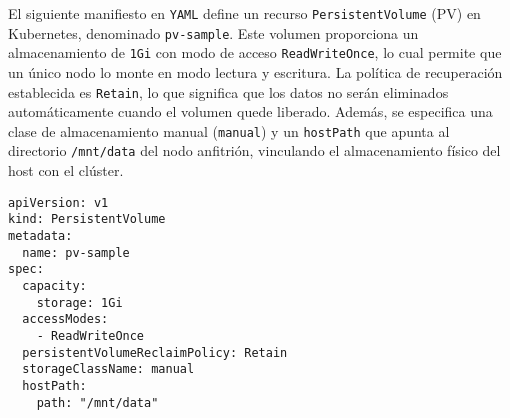 El siguiente manifiesto en \texttt{YAML} define un recurso \texttt{PersistentVolume} (PV) en Kubernetes, denominado \texttt{pv-sample}. Este volumen proporciona un almacenamiento de \texttt{1Gi} con modo de acceso \texttt{ReadWriteOnce}, lo cual permite que un único nodo lo monte en modo lectura y escritura. La política de recuperación establecida es \texttt{Retain}, lo que significa que los datos no serán eliminados automáticamente cuando el volumen quede liberado. Además, se especifica una clase de almacenamiento manual (\texttt{manual}) y un \texttt{hostPath} que apunta al directorio \texttt{/mnt/data} del nodo anfitrión, vinculando el almacenamiento físico del host con el clúster.

\begin{verbatim}
apiVersion: v1
kind: PersistentVolume
metadata:
  name: pv-sample
spec:
  capacity:
    storage: 1Gi
  accessModes:
    - ReadWriteOnce
  persistentVolumeReclaimPolicy: Retain
  storageClassName: manual
  hostPath:
    path: "/mnt/data"
\end{verbatim}
